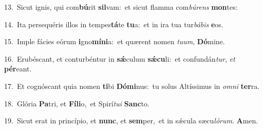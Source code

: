 {\numbfont\textcolor{\numbcolor}{13.}}~Sicut ignis, qui com\-\textbf{bú}\-rit \textbf{sil}\-vam:~\star et sicut flamma com\-\textit{bú}\-\textit{rens} \textbf{mon}\-tes:\par
{\numbfont\textcolor{\numbcolor}{14.}}~Ita persequéris illos in tempes\-\textbf{tá}\-te \textbf{tu}\-a:~\star et in ira tua tur\-\textit{bá}\-\textit{bis} \textbf{e}\-os.\par
{\numbfont\textcolor{\numbcolor}{15.}}~Imple fácies eórum \textbf{i}\-gno\-\textbf{mí}\-\textbf{ni}a:~\star et quærent nomen \textit{tu}\-\textit{um}, \textbf{Dó}\-mine.\par
{\numbfont\textcolor{\numbcolor}{16.}}~Erubéscant, et conturbéntur in \textbf{sǽ}\-culum \textbf{sǽ}\-\textbf{cu}li:~\star et confundán\-\textit{tur}\-, \textit{et} \textbf{pér}\-eant.\par
{\numbfont\textcolor{\numbcolor}{17.}}~Et cognóscant quia nomen \textbf{ti}\-bi \textbf{Dó}\-\textbf{mi}nus:~\star tu solus Altíssimus in \textit{om}\-\textit{ni} \textbf{ter}\-ra.\par
{\numbfont\textcolor{\numbcolor}{18.}}~Glória \textbf{Pa}\-tri, et \textbf{Fí}\-\textbf{li}o,~\star et Spirí\-\textit{tu}\-\textit{i} \textbf{Sanc}\-to.\par
{\numbfont\textcolor{\numbcolor}{19.}}~Sicut erat in princípio, et \textbf{nunc}\-, et \textbf{sem}\-per,~\star et in sǽcula sæcu\-\textit{ló}\-\textit{rum}. \textbf{A}\-men.\par
